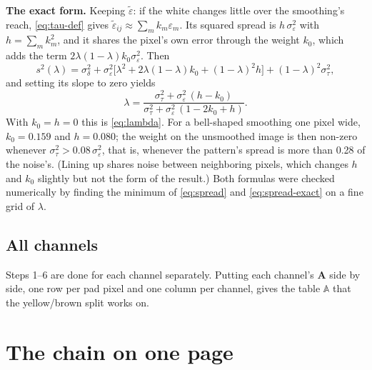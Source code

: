 \documentclass[11pt,letter]{article}
\newcommand{\iA}{\mathbf{A}}   %
\newcommand{\tblA}{\mathbb{A}} %
\begin{document}
\textbf{The exact form.}  Keeping $\widetilde\varepsilon$: if the white
changes little over the smoothing's reach, \eqref{eq:tau-def} gives
$\widetilde\varepsilon_{ij} \approx \sum_m k_m \varepsilon_m$.  Its squared
spread is $h\,\sigma_\varepsilon^2$ with $h = \sum_m k_m^2$, and it shares
the pixel's own error through the weight $k_0$, which adds the term
$2\lambda(1 - \lambda)k_0\sigma_\varepsilon^2$.  Then
\begin{equation}
  s^2(\lambda) = \sigma_\delta^2
    + \sigma_\varepsilon^2\bigl[\lambda^2 + 2\lambda(1-\lambda)k_0
    + (1-\lambda)^2 h\bigr] + (1-\lambda)^2\sigma_\tau^2 ,
  \label{eq:spread-exact}
\end{equation}
and setting its slope to zero yields
\begin{equation}
  \lambda = \frac{\sigma_\tau^2 + \sigma_\varepsilon^2\,(h - k_0)}
                 {\sigma_\tau^2 + \sigma_\varepsilon^2\,(1 - 2k_0 + h)} .
  \label{eq:lambda-exact}
\end{equation}
With $k_0 = h = 0$ this is \eqref{eq:lambda}.  For a bell-shaped smoothing
one pixel wide, $k_0 = 0.159$ and $h = 0.080$; the weight on the
unsmoothed image is then non-zero whenever
$\sigma_\tau^2 > 0.08\,\sigma_\varepsilon^2$, that is, whenever the
pattern's spread is more than 0.28 of the noise's.  (Lining up shares
noise between neighboring pixels, which changes $h$ and $k_0$ slightly but
not the form of the result.)  Both formulas were checked numerically by
finding the minimum of \eqref{eq:spread} and \eqref{eq:spread-exact} on a
fine grid of $\lambda$.

\subsection{All channels}

Steps 1--6 are done for each channel separately.  Putting each channel's
$\iA$ side by side, one row per pad pixel and one column per channel, gives
the table $\tblA$ that the yellow/brown split works on.

\section{The chain on one page}
\label{sec:summary}
\end{document}
